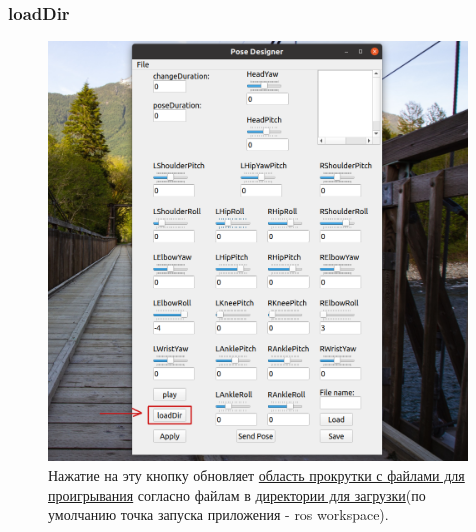 \documentclass[12pt,a4paper]{article}
\begin{document}
\subsubsection{loadDir}
\label{loadDir}
\begin{figure}[h!]
    \centering
    \includegraphics[width=0.99\textwidth]{images/loadDir.png}
    \caption{Нажатие на эту кнопку обновляет \hyperref[scroll]{область прокрутки с файлами для проигрывания} согласно файлам в \hyperref[file]{директории для загрузки}(по умолчанию точка запуска приложения - ros workspace).}
    \label{fig:file}
\end{figure}
\newpage
\end{document}
